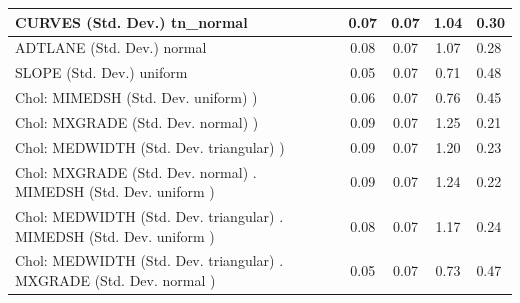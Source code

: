 \begin{table}
\begin{center}
\begin{tabular}{|l|l|c|c|c|l|}
			\hline
			CURVES (Std. Dev.) tn_normal &  & 0.07 & 0.07 & 1.04 & 0.30 \\
			\hline
			ADTLANE (Std. Dev.) normal &  & 0.08 & 0.07 & 1.07 & 0.28 \\
			\hline
			SLOPE (Std. Dev.) uniform &  & 0.05 & 0.07 & 0.71 & 0.48 \\
			\hline
			 Chol: MIMEDSH (Std. Dev. uniform) ) &  & 0.06 & 0.07 & 0.76 & 0.45 \\
			\hline
			 Chol: MXGRADE (Std. Dev. normal) ) &  & 0.09 & 0.07 & 1.25 & 0.21 \\
			\hline
			 Chol: MEDWIDTH (Std. Dev. triangular) ) &  & 0.09 & 0.07 & 1.20 & 0.23 \\
			\hline
			 Chol: MXGRADE (Std. Dev. normal) . MIMEDSH (Std. Dev.   uniform ) &  & 0.09 & 0.07 & 1.24 & 0.22 \\
			\hline
			 Chol: MEDWIDTH (Std. Dev. triangular) . MIMEDSH (Std. Dev.   uniform ) &  & 0.08 & 0.07 & 1.17 & 0.24 \\
			\hline
			 Chol: MEDWIDTH (Std. Dev. triangular) . MXGRADE (Std. Dev.   normal ) &  & 0.05 & 0.07 & 0.73 & 0.47 \\
			\hline
		\end{tabular}
	\end{center}
\end{table}